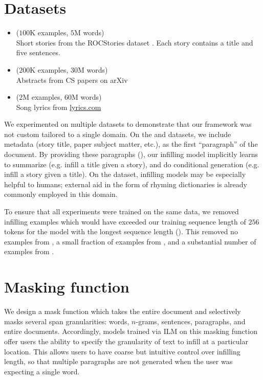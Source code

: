 \section{Datasets}\label{sec:datasets}

\begin{itemize}[leftmargin=*,label=-]
    \item \stories{} ($100$K examples, $5$M words) \\
    Short stories from the ROCStories dataset \citep{mostafazadeh2016corpus}. Each story contains a title and five sentences.
    \item \abstracts{} ($200$K examples, $30$M words) \\
    Abstracts from CS papers on arXiv
    \item \lyrics{} ($2$M examples, $60$M words) \\
    Song lyrics from \url{lyrics.com}
\end{itemize}

\noindent We experimented on multiple datasets to demonstrate that our framework was not custom tailored to a single domain. 
On the \stories{} and \abstracts{} datasets, we include metadata (story title, paper subject matter, etc.), as the first ``paragraph'' of the document. 
By providing these paragraphs (), our infilling model implicitly learns to summarize (e.g. infill a title given a story), and do conditional generation (e.g. infill a story given a title).
On the \lyrics{} dataset, infilling models may be especially helpful to humans; external aid in the form of rhyming dictionaries is already commonly employed in this domain.

To ensure that all experiments were trained on the same data,
we removed infilling examples which would have exceeded our training sequence length of $256$ tokens for the model with the longest sequence length (\lmall{}). 
This removed no examples from \stories{}, a small fraction of examples from \lyrics{}, and a substantial number of examples from \abstracts{}. 

\section{Masking function}\label{sec:mask_deets}

We design a mask function which takes the entire document and selectively masks several span granularities: words, $n$-grams, sentences, paragraphs, and entire documents. 
Accordingly, models trained via ILM on this masking function offer users the ability to specify the granularity of text to infill at a particular location. 
This allows users to have coarse but intuitive control over infilling length, so that multiple paragraphs are not generated when the user was expecting a single word.

